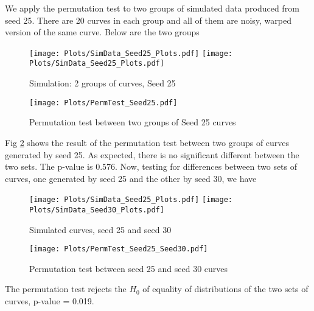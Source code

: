 We apply the permutation test to two groups of simulated data produced from seed 25. There are 20 curves in each group and all of them are noisy, warped version of the same curve. Below are the two groups
\begin{figure}[H]
\begin{center}
\texttt{[image: Plots/SimData\_Seed25\_Plots.pdf]}
\texttt{[image: Plots/SimData\_Seed25\_Plots.pdf]}
\end{center}
\caption{Simulation: 2 groups of curves, Seed 25}
\label{fig:FigSim_2groupsSeed25}
\end{figure}
\begin{figure}[H]
\begin{center}
\texttt{[image: Plots/PermTest\_Seed25.pdf]}
\end{center}
\caption{Permutation test between two groups of Seed 25 curves}
\label{fig:Permtest_2groupsSeed25}
\end{figure}
Fig \ref{fig:Permtest_2groupsSeed25} shows the result of the permutation test between two groups of curves generated by seed 25. As expected, there is no significant different between the two sets. The p-value is $0.576$. Now, testing for differences between two sets of curves, one generated by seed 25 and the other by seed 30, we have
\begin{figure}[H]
\begin{center}
\texttt{[image: Plots/SimData\_Seed25\_Plots.pdf]}
\texttt{[image: Plots/SimData\_Seed30\_Plots.pdf]}
\end{center}
\caption{Simulated curves, seed 25 and seed 30}
\label{fig:FigSim_Seed25and30}
\end{figure}
\begin{figure}[H]
\begin{center}
\texttt{[image: Plots/PermTest\_Seed25\_Seed30.pdf]}
\end{center}
\caption{Permutation test between seed 25 and seed 30 curves}
\label{fig:Permtest_Seed25and30}
\end{figure}
The permutation test rejects the $H_0$ of equality of distributions of the two sets of curves, p-value = 0.019. 


